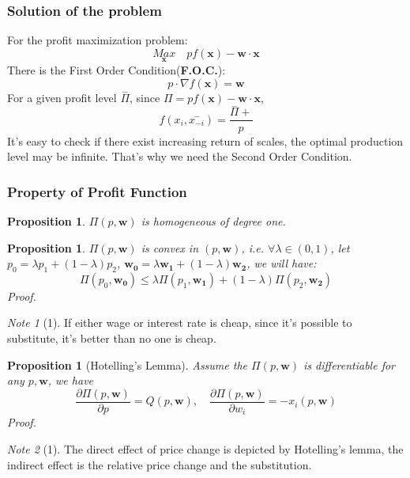 \documentclass{article}
\theoremstyle{plain}
\newtheorem{prop}[thm]{Proposition}
\theoremstyle{definition}
\theoremstyle{remark}
\newtheorem*{note}{Note}
\begin{document}
\subsubsection{Solution of the problem}
For the profit maximization problem:
\begin{equation}
	\underset{\bm{x}}{Max}\quad p f(\bm{x}) - \bm{w}\cdot\bm{x}
\end{equation}
There is the First Order Condition({\bf F.O.C.}):
\begin{equation}
	p \cdot \nabla f(\bm{x})  = \bm{w}
\end{equation}
For a given profit level $\overset{-}{\Pi}$, since $\Pi = p f(\bm{x}) - \bm{w} \cdot \bm{x}$, 
\begin{equation}
	f(x_i,\overset{-}{x_{-i}}) = \frac{\overset{-}{\Pi}+}{p}
\end{equation} 
It's easy to check if there exist increasing return of scales, the optimal production level may be infinite. That's why we need the Second Order Condition. 
\subsubsection{Property of Profit Function}
\begin{prop}
$\Pi(p,\bm{w})$ is homogeneous of degree one.
\end{prop}
\begin{prop}
$\Pi(p,\bm{w})$ is convex in $(p,\bm{w})$, i.e. $\forall \lambda \in (0,1)$, let $p_0 = \lambda p_1 + (1-\lambda)p_2$, $\bm{w_0} = \lambda \bm{w_1} + (1-\lambda) \bm{w_2}$, we will have:
\begin{equation}
	\Pi(p_0,\bm{w_0})\leq \lambda \Pi(p_1,\bm{w_1}) + (1-\lambda)\Pi(p_2,\bm{w_2})
\end{equation}
Proof.
\end{prop}
\begin{note}[1]
If either wage or interest rate is cheap, since it's possible to substitute, it's better than no one is cheap.
\end{note}

\begin{prop}[Hotelling's Lemma]
Assume the $\Pi(p,\bm{w})$ is differentiable for any $p,\bm{w}$, we have
\begin{equation}
\frac{\partial \Pi(p,\bm{w})}{\partial p} = Q(p,\bm{w}),  \quad \frac{\partial \Pi(p,\bm{w})}{\partial w_i} = - x_i(p,\bm{w})
\end{equation}
Proof.
\end{prop}
\begin{note}[1]
The direct effect of price change is depicted by Hotelling's lemma, the indirect effect is the relative price change and the substitution.
\end{note}
\end{document}
